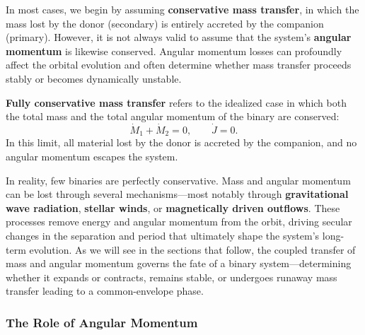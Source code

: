 \par
In most cases, we begin by assuming \textbf{conservative mass transfer}, in which the mass lost by the donor (secondary) is entirely accreted by the companion (primary). However, it is not always valid to assume that the system’s \textbf{angular momentum} is likewise conserved. Angular momentum losses can profoundly affect the orbital evolution and often determine whether mass transfer proceeds stably or becomes dynamically unstable.

\begin{definition}
\textbf{Fully conservative mass transfer} refers to the idealized case in which both the total mass and the total angular momentum of the binary are conserved:
\[
\dot{M}_1 + \dot{M}_2 = 0, \qquad \dot{J} = 0.
\]
In this limit, all material lost by the donor is accreted by the companion, and no angular momentum escapes the system.
\end{definition}

\par
In reality, few binaries are perfectly conservative.  Mass and angular momentum can be lost through several mechanisms—most notably through \textbf{gravitational wave radiation}, \textbf{stellar winds}, or \textbf{magnetically driven outflows}.  These processes remove energy and angular momentum from the orbit, driving secular changes in the separation and period that ultimately shape the system’s long-term evolution.
\medskip
\noindent
As we will see in the sections that follow, the coupled transfer of mass and angular momentum governs the fate of a binary system—determining whether it expands or contracts, remains stable, or undergoes runaway mass transfer leading to a common-envelope phase.

\subsubsection{The Role of Angular Momentum}

